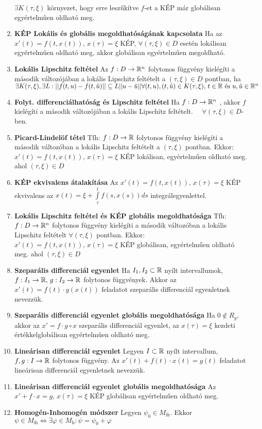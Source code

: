 \documentclass{article}
\begin{document}
\begin{enumerate}
	$\exists K(\tau,\xi)$ környezet, hogy erre leszűkítve $f$-et  a KÉP már globálisan egyértelmûen oldható meg.
	\item\textbf{KÉP Lokális és globális megoldhatóságának kapcsolata}\br
	Ha az $x'(t)=f(t, x(t))\text{,  }x(\tau)=\xi$ KÉP, $\forall(\tau,\xi)\in D$
	esetén lokálisan egyértelmûen oldható meg, akkor globálisan egyértelmûen megoldható.
	\item\textbf{Lokális Lipschitz feltétel}\br
	Az $f:D\rightarrow\mathbb{R}^n$ folytonos függvény kielégíti a második változójában a lokális Lipschitz
	feltételt a $(\tau,\xi)\in D$ pontban, ha $\exists K(\tau,\xi),\exists
	L:||f(t,u)-f(t,\tilde{u})||\subseteq L||u-\tilde{u}||\br\forall(t,u),(t,
	\tilde{u})\in K(\tau,\xi)\text{,  }t\in\R\text{  és  }u,\tilde{u}\in\R^n$
	\item\textbf{Folyt. differenciálhatóság és Lipschitz feltétel}\br
	Ha $f:D\rightarrow\mathbb{R}^n$ \folytdifh, akkor $f$ kielégíti a második változójában a lokális Lipschitz feltételt.
	$\quad\forall(\tau,\xi)\in D$-ben.
	\item\textbf{Picard-Lindelöf tétel}\br
	Tfh: $f:D\rightarrow\mathbb{R}$ folytonos függvény kielégíti a második változóban a lokális Lipschitz feltételt a
	$(\tau,\xi)$ pontban. Ekkor: $x'(t)=f(t, x(t))\text{,  }x(\tau)=\xi$ KÉP lokálisan, egyértelműen oldható meg.\br
	ahol $(\tau,\xi)\in D$
	\item\textbf{KÉP ekvivalens átalakítása}\br
	Az $x'(t)=f(t, x(t))\text{,  }x(\tau)=\xi$ KÉP ekvivalens az $x(t)=\xi+
	\int\limits_{\tau}^{t}f(s,x(s))ds$ integrálegyenlettel.
	\item\textbf{Lokális Lipschitz feltétel és KÉP globális megoldhatósága}\br
	Tfh: $f:D\rightarrow\mathbb{R}^n$ folytonos függvény kielégíti a második változóban a lokális Lipschitz feltételt
	$\forall(\tau,\xi)$ pontban. Ekkor: $x'(t)=f(t, x(t))\text{,  }x(\tau)=\xi$ KÉP globálisan, egyértelműen oldható meg.\br
	ahol $(\tau,\xi)\in D$
	\item\textbf{Szeparális differenciál egyenlet}\br
	Ha $I_1,I_2\subset\mathbb{R}$ nyílt intervallumok, $f:I_1\rightarrow\mathbb{R}\text{,  }
	g:I_2\rightarrow\mathbb{R}$ folytonos függvények.\br
	Akkor az $x'(t)=f(t)\cdot g(x(t))$ feladatot szeparális differenciál egyenletnek nevezzük.
	\item\textbf{Szeparális differenciál egyenlet globális megoldhatósága}\br
	Ha $0\notin R_g$, akkor az $x'=f\cdot g \circ x$ szeparális differenciál egyenlet, az 
	$x(\tau)=\xi$ kezdeti értékkel\br globálisan egyértelmûen oldható meg.
	\item\textbf{Lineárisan differenciál egyenlet}\br
	Legyen $I\subset\mathbb{R}$ nyílt intervallum, $f,g:I\rightarrow\mathbb{R}$ folytonos függvény.
	Az $x'(t)+f(t)\cdot x(t)=g(t)$ feladatot lineárisan differenciál egyenletnek nevezzük.
	\item\textbf{Lineárisan differenciál egyenlet globális megoldhatósága}\br
	Az $x'+f\cdot x=g\text{,  }x(\tau)=\xi$ KÉP globálisan egyértelműen oldható meg.
	\item\textbf{Homogén-Inhomogén módszer}\br
	Legyen $\psi_0\in M_{\text{ih}}$. Ekkor $\psi\in M_{\text{ih}}\Leftrightarrow
	\exists\varphi\in M_{\text{h}}:\psi=\psi_0+\varphi$
\end{enumerate}
\end{document}
